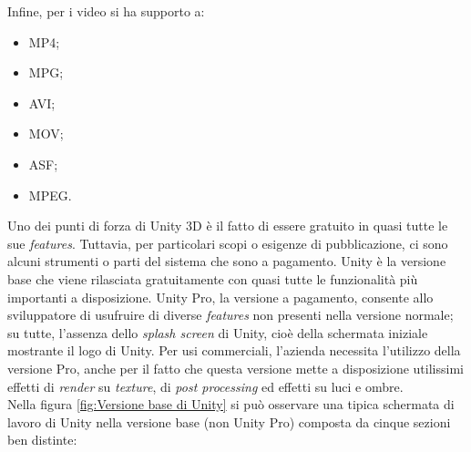 Infine, per i video si ha supporto a:
\begin{multicols}{3}
	\begin{itemize}
		\item MP4;
		\item MPG;
		\item AVI;
		\item MOV;
		\item ASF;
		\item MPEG.
	\end{itemize}
\end{multicols}
\noindent
Uno dei punti di forza di Unity 3D \`e il fatto di essere gratuito in quasi tutte le sue \textit{features}. Tuttavia,
per particolari scopi o esigenze di pubblicazione, ci sono alcuni strumenti o parti del sistema che sono a pagamento. Unity \`e la versione base che viene rilasciata gratuitamente con quasi tutte le funzionalit\`a pi\`u importanti a disposizione. Unity Pro, la versione a pagamento, consente allo sviluppatore di usufruire di diverse \textit{features} non presenti nella versione normale; su tutte, l'assenza dello \textit{splash screen} di Unity, cio\`e della schermata iniziale mostrante il logo di Unity.
Per usi commerciali, l'azienda necessita l'utilizzo della versione Pro, anche per il fatto che questa versione mette a disposizione utilissimi effetti di \textit{render} su \textit{texture\gloss}, di \textit{post processing} ed effetti su luci e ombre.
\\
\noindent
Nella figura \ref{fig:Versione base di Unity} si pu\`o osservare una tipica schermata di lavoro di Unity nella versione base (non Unity Pro) composta da cinque sezioni ben distinte:

